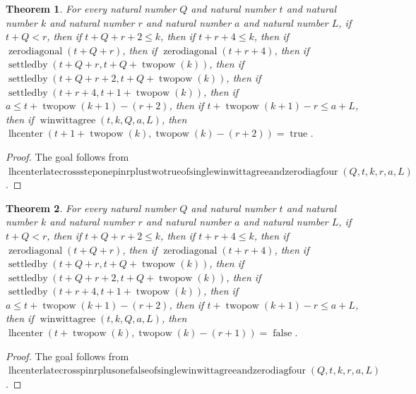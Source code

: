 \documentclass[11pt]{article}
\newtheorem{theorem}{Theorem}[section]
\theoremstyle{definition}
\begin{document}
\begin{theorem}
\label{ll:paper:lhcenter-late-cross-step-one-pin-r-plus-two-true-of-single-winwittagree-and-zero-diag-four}
For every natural number \(Q\) and natural number \(t\) and natural number \(k\) and natural number \(r\) and natural number \(a\) and natural number \(L\), if \(t + Q < r\), then if \(t + Q + r + 2 \le k\), then if \(t + r + 4 \le k\), then if \(\operatorname{zerodiagonal}(t + Q + r)\), then if \(\operatorname{zerodiagonal}(t + r + 4)\), then if \(\operatorname{settledby}(t + Q + r, t + Q + \operatorname{twopow}(k))\), then if \(\operatorname{settledby}(t + Q + r + 2, t + Q + \operatorname{twopow}(k))\), then if \(\operatorname{settledby}(t + r + 4, t + 1 + \operatorname{twopow}(k))\), then if \(a \le t + \operatorname{twopow}(k + 1) - (r + 2)\), then if \(t + \operatorname{twopow}(k + 1) - r \le a + L\), then if \(\operatorname{winwittagree}(t, k, Q, a, L)\), then \(\operatorname{lhcenter}(t + 1 + \operatorname{twopow}(k), \operatorname{twopow}(k) - (r + 2)) = \operatorname{true}\).
\end{theorem}
\begin{proof}
The goal follows from \(\operatorname{lhcenterlatecrosssteponepinrplustwotrueofsinglewinwittagreeandzerodiagfour}(Q, t, k, r, a, L)\).
\end{proof}
\begin{theorem}
\label{ll:paper:lhcenter-late-cross-pin-r-plus-one-false-of-single-winwittagree-and-zero-diag-four}
For every natural number \(Q\) and natural number \(t\) and natural number \(k\) and natural number \(r\) and natural number \(a\) and natural number \(L\), if \(t + Q < r\), then if \(t + Q + r + 2 \le k\), then if \(t + r + 4 \le k\), then if \(\operatorname{zerodiagonal}(t + Q + r)\), then if \(\operatorname{zerodiagonal}(t + r + 4)\), then if \(\operatorname{settledby}(t + Q + r, t + Q + \operatorname{twopow}(k))\), then if \(\operatorname{settledby}(t + Q + r + 2, t + Q + \operatorname{twopow}(k))\), then if \(\operatorname{settledby}(t + r + 4, t + 1 + \operatorname{twopow}(k))\), then if \(a \le t + \operatorname{twopow}(k + 1) - (r + 2)\), then if \(t + \operatorname{twopow}(k + 1) - r \le a + L\), then if \(\operatorname{winwittagree}(t, k, Q, a, L)\), then \(\operatorname{lhcenter}(t + \operatorname{twopow}(k), \operatorname{twopow}(k) - (r + 1)) = \operatorname{false}\).
\end{theorem}
\begin{proof}
The goal follows from \(\operatorname{lhcenterlatecrosspinrplusonefalseofsinglewinwittagreeandzerodiagfour}(Q, t, k, r, a, L)\).
\end{proof}
\end{document}
